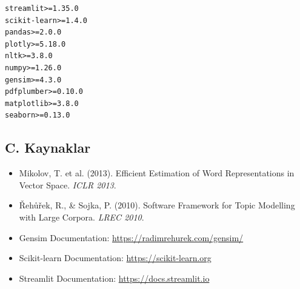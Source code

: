 \documentclass[12pt, a4paper]{article}
\begin{document}
\begin{lstlisting}[style=kod, language={}, caption={requirements.txt}]
streamlit>=1.35.0
scikit-learn>=1.4.0
pandas>=2.0.0
plotly>=5.18.0
nltk>=3.8.0
numpy>=1.26.0
gensim>=4.3.0
pdfplumber>=0.10.0
matplotlib>=3.8.0
seaborn>=0.13.0
\end{lstlisting}

\subsection*{C. Kaynaklar}

\begin{itemize}
    \item Mikolov, T. et al. (2013). Efficient Estimation of Word Representations in Vector Space. \textit{ICLR 2013}.
    \item Řehůřek, R., \& Sojka, P. (2010). Software Framework for Topic Modelling with Large Corpora. \textit{LREC 2010}.
    \item Gensim Documentation: \url{https://radimrehurek.com/gensim/}
    \item Scikit-learn Documentation: \url{https://scikit-learn.org}
    \item Streamlit Documentation: \url{https://docs.streamlit.io}
\end{itemize}
\end{document}

